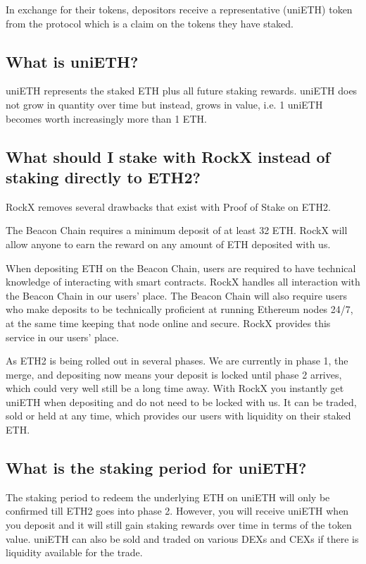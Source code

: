 \documentclass{article}
\begin{document}
In exchange for their tokens, depositors receive a representative (uniETH) token from the protocol which is a claim on the tokens they have staked.

\subsection{What is uniETH?}

uniETH represents the staked ETH plus all future staking rewards. uniETH does not grow in quantity over time but instead, grows in value, i.e. 1 uniETH becomes worth increasingly more than 1 ETH.

\subsection{What should I stake with RockX instead of staking directly to ETH2?}

RockX removes several drawbacks that exist with Proof of Stake on ETH2.

The Beacon Chain requires a minimum deposit of at least 32 ETH. RockX will allow anyone to earn the reward on any amount of ETH deposited with us.

When depositing ETH on the Beacon Chain, users are required to have technical knowledge of interacting with smart contracts. RockX handles all interaction with the Beacon Chain in our users’ place. The Beacon Chain will also require users who make deposits to be technically proficient at running Ethereum nodes 24/7, at the same time keeping that node online and secure. RockX provides this service in our users’ place.

As ETH2 is being rolled out in several phases. We are currently in phase 1, the merge, and depositing now means your deposit is locked until phase 2 arrives, which could very well still be a long time away. With RockX you instantly get uniETH when depositing and do not need to be locked with us. It can be traded, sold or held at any time, which provides our users with liquidity on their staked ETH.

\subsection{What is the staking period for uniETH?}
The staking period to redeem the underlying ETH on uniETH will only be confirmed till ETH2 goes into phase 2. However, you will receive uniETH when you deposit and it will still gain staking rewards over time in terms of the token value. uniETH can also be sold and traded on various DEXs and CEXs if there is liquidity available for the trade.
\end{document}
